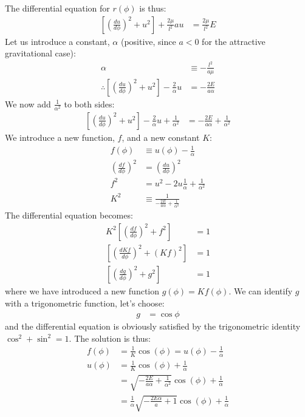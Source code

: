The differential equation for $r(\phi)$ is thus:
\begin{align}
\left[\left( \frac{du}{d\phi} \right)^2+u^2\right]+\frac{2\mu}{l^2}au&=\frac{2\mu}{l^2}E
\end{align}
Let us introduce a constant, $\alpha$ (positive, since $a<0$ for the attractive gravitational case):
\begin{align}
\alpha&\equiv-\frac{l^2}{a\mu}\nonumber\\
\therefore \left[\left( \frac{du}{d\phi} \right)^2+u^2\right]-\frac{2}{\alpha}u&=-\frac{2E}{a\alpha}
\end{align}
We now add $\frac{1}{\alpha^2}$ to both sides:
\begin{align}
\left[\left( \frac{du}{d\phi} \right)^2+u^2\right]-\frac{2}{\alpha}u+\frac{1}{\alpha^2}&=-\frac{2E}{a\alpha}+\frac{1}{\alpha^2}\nonumber
\end{align}
We introduce a new function, $f$, and a new constant $K$:
\begin{align}
f(\phi)&\equiv u(\phi)-\frac{1}{\alpha}\nonumber\\
\left(\frac{df}{d\phi}\right)^2&=\left(\frac{du}{d\phi}\right)^2\nonumber\\
f^2&=u^2-2u\frac{1}{\alpha}+\frac{1}{\alpha^2}\nonumber\\
K^2&\equiv\frac{1}{-\frac{2E}{a\alpha}+\frac{1}{\alpha^2}}
\end{align}
The differential equation becomes:
\begin{align}
K^2\left[\left( \frac{df}{d\phi} \right)^2+f^2\right]&=1\nonumber\\
\left[\left( \frac{dKf}{d\phi} \right)^2+(Kf)^2\right]&=1\nonumber\\
\left[\left( \frac{dg}{d\phi} \right)^2+g^2\right]&=1\nonumber
\end{align}
where we have introduced a new function $g(\phi)=Kf(\phi)$. We can identify $g$ with a trigonometric function, let's choose:
\begin{align}
g&=\cos\phi
\end{align}
and the differential equation is obviously satisfied by the trigonometric identity $\cos^2+\sin^2=1$. The solution is thus:
\begin{align}
f(\phi)&=\frac{1}{K}\cos(\phi)= u(\phi)-\frac{1}{\alpha}\nonumber\\
u(\phi)&=\frac{1}{K}\cos(\phi)+\frac{1}{\alpha}\nonumber\\
&=\sqrt{-\frac{2E}{a\alpha}+\frac{1}{\alpha^2}}\cos(\phi)+\frac{1}{\alpha}\nonumber\\
&=\frac{1}{\alpha}\sqrt{-\frac{2E\alpha}{a}+1}\cos(\phi)+\frac{1}{\alpha}\nonumber
\end{align}
